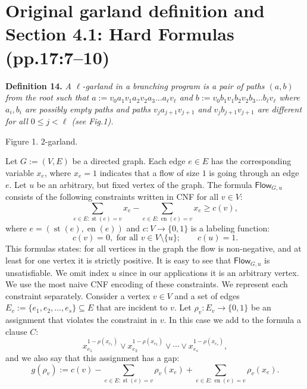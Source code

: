 \documentclass[10pt,a4paper]{article}
\newcommand{\Flow}{\mathsf{Flow}}
\newcommand{\st}{\operatorname{st}}
\newcommand{\en}{\operatorname{en}}
\newenvironment{result}[1]{\par\medskip\noindent\textbf{#1.}\itshape}{\par\medskip}
\begin{document}
\section*{Original garland definition and Section 4.1: Hard Formulas (pp.17:7--10)}
\begin{result}{Definition 14}
A $\ell$-garland in a branching program is a pair of paths $(a,b)$ from the root such that $a:=v_0a_1v_1a_2v_2a_3\ldots a_\ell v_\ell$ and $b:=v_0b_1v_1b_2v_2b_3\ldots b_\ell v_\ell$ where $a_i,b_i$ are possibly empty paths and paths $v_ja_{j+1}v_{j+1}$ and $v_jb_{j+1}v_{j+1}$ are different for all $0\le j<\ell$ (see Fig.1).
\end{result}
\begin{center}\par Figure 1. $2$-garland.\end{center}
Let $G:=(V,E)$ be a directed graph. Each edge $e\in E$ has the corresponding variable $x_e$, where $x_e=1$ indicates that a flow of size $1$ is going through an edge $e$. Let $u$ be an arbitrary, but fixed vertex of the graph.
The formula $\Flow_{G,u}$ consists of the following constraints written in CNF for all $v\in V$:
\[\sum_{e\in E:\st(e)=v}x_e-\sum_{e\in E:\en(e)=v}x_e\ge c(v),\]
where $e=(\st(e),\en(e))$ and $c:V\to\{0,1\}$ is a labeling function:
\[c(v)=0,\text{ for all }v\in V\setminus\{u\};\qquad c(u)=1.\]
This formulas states: for all vertices in the graph the flow is non-negative, and at least for one vertex it is strictly positive. It is easy to see that $\Flow_{G,u}$ is unsatisfiable. We omit index $u$ since in our applications it is an arbitrary vertex.
We use the most naive CNF encoding of these constraints. We represent each constraint separately. Consider a vertex $v\in V$ and a set of edges $E_v:=\{e_1,e_2,\ldots,e_s\}\subseteq E$ that are incident to $v$. Let $\rho_v:E_v\to\{0,1\}$ be an assignment that violates the constraint in $v$. In this case we add to the formula a clause $C$:
\[x_{e_1}^{1-\rho(x_{e_1})}\vee x_{e_2}^{1-\rho(x_{e_2})}\vee\cdots\vee x_{e_s}^{1-\rho(x_{e_s})},\]
and we also say that this assignment has a gap:
\[g(\rho_v):=c(v)-\sum_{e\in E:\st(e)=v}\rho_v(x_e)+\sum_{e\in E:\en(e)=v}\rho_v(x_e).\]
\end{document}
